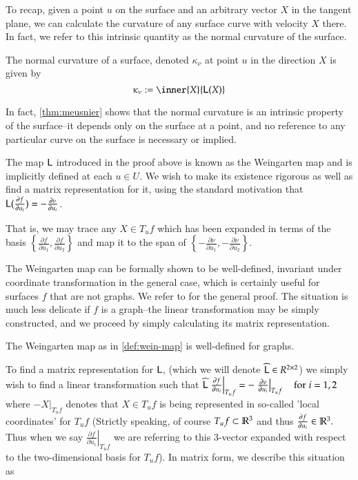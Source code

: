 	To recap, given a point $u$ on the surface and an arbitrary vector $X$ in the tangent plane, we can calculate the curvature of any surface curve with velocity $X$ there. In fact, we refer to this intrinsic quantity as the normal curvature of the surface.
	
	\begin{defn} \label{def:normal-curvature}
		The normal curvature of a surface, denoted $\kappa_\nu$ at point $u$ in the direction $X$ is given by
		\[\kappa_\nu :=  \inner{X}{\wein(X)} \]
	\end{defn}
	In fact, \cref{thm:meusnier} shows that the normal curvature is an intrinsic property of the surface--it depends only on the
	surface at a point, and no reference to any particular curve on the surface is necessary or implied.
	
	
	The map $\mathsf{L}$ introduced in the proof above is known as the Weingarten map
	and is implicitly defined at each $u \in U$. 
	We wish to make its existence rigorous as well as find a matrix representation for it, using the standard motivation that $\mathsf{L}(\frac{\partial f}{\partial u_i}) = - \frac{\partial \nu}{\partial u_i}$.
	
	
	That is, we may trace any $X \in T_u f$ which has been expanded in terms of the basis 
	$\left\{\frac{\partial f}{\partial u_1} , \frac{\partial f}{\partial u_2}\right\}$
	and map it to the span of $\left\{-\frac{\partial \nu}{\partial u_1} , -\frac{\partial \nu}{\partial u_2}\right\}$. 
	
	The Weingarten map can be formally shown to be well-defined, invariant under coordinate transformation in the general case, which is certainly useful for surfaces $f$ that are not graphs. We refer to \cite{Kuhnel-DiffGeo} for the general proof. The situation is much less delicate if $f$ is a graph--the linear transformation may be simply constructed, and we proceed by simply calculating its matrix representation.	
	\begin{lemma}
		The Weingarten map as in \cref{def:wein-map} is well-defined for graphs.
	\end{lemma}
	To find a matrix representation for $\mathsf{L}$, (which we will denote $\widehat{\mathsf{L}} \in R^{2\times2}$) we simply wish to find a linear transformation
	such that
	$\widehat{\mathsf{L}} \left.\frac{\partial f}{\partial u_i}\right|_{T_u f}
		= - \left.\frac{\partial \nu}{\partial u_i}\right|_{T_u f} \quad \textrm{for} \; i=1,2$
			where $- \left.X\right|_{T_u f}$ denotes that $X \in T_u f$ is being represented in so-called
	'local coordinates' for $T_u f$ (Strictly speaking, of course $T_u f \subset \mathbb{R}^3$ and thus
	$\frac{\partial f}{\partial u_i} \in \mathbb{R}^3.$ Thus when we say $ \left.\frac{\partial f}{\partial u_i}\right|_{T_u f}$ we are referring to this 3-vector expanded with respect to the two-dimensional basis for $T_u f$). In matrix form, we describe this situation as
	
